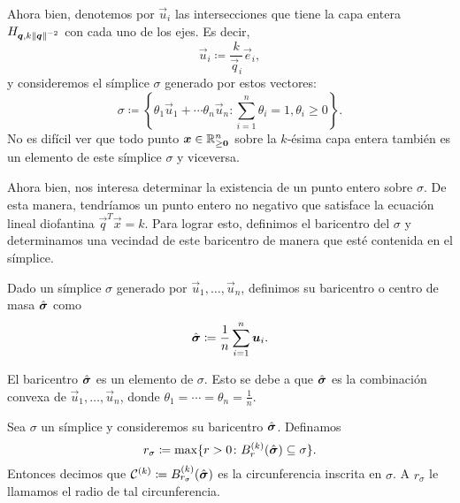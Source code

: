 Ahora bien, denotemos por $\vec{u}_i$ las intersecciones que tiene la capa entera $H_{\boldsymbol{q},
k\left\lVert \boldsymbol{q} \right\rVert^{-2}}$ con cada uno de los ejes. Es decir,
\begin{equation}
	\label{eq:generators}
	\vec{u}_i \coloneq \frac{k}{\vec{q}_i}\vec{e}_i,
\end{equation}
y consideremos el símplice $\sigma$ generado por estos vectores:
\begin{equation*}
	\sigma \coloneq \left\lbrace \theta_1\vec{u}_1 + \cdots \theta_n\vec{u}_n \colon
		\sum_{i=1}^{n}\theta_i = 1, \theta_i \geq 0 \right\rbrace.
\end{equation*}
No es difícil ver que todo punto $\boldsymbol{x} \in \mathbb{R}^n_{\geq \boldsymbol{0}}$ sobre la $k$-ésima capa entera
también es un elemento de este símplice $\sigma$ y viceversa.

Ahora bien, nos interesa determinar la existencia de un punto entero sobre $\sigma$. De esta manera,
tendríamos un punto entero no negativo que satisface la ecuación lineal diofantina
$\vec{q}^T\vec{x} = k$. Para lograr esto, definimos el baricentro del $\sigma$ y determinamos una
vecindad de este baricentro de manera que esté contenida en el símplice.

\begin{definition}
	Dado un símplice $\sigma$ generado por $\vec{u}_1, \ldots, \vec{u}_n$, definimos su baricentro o
	centro de masa $\hat{\boldsymbol{ \sigma }}$ como
	\begin{equation*}
		\hat{\boldsymbol{ \sigma }} \coloneq \frac{1}{n} \sum_{i=1}^{n}\boldsymbol{u}_i.
	\end{equation*}
\end{definition}
\begin{observation}
	El baricentro $\hat{\boldsymbol{ \sigma }}$ es un elemento de $\sigma$. Esto se debe a que $\hat{\boldsymbol{ \sigma }}$ es la
	combinación convexa de $\vec{u}_1, \ldots, \vec{u}_n$, donde $\theta_1 = \cdots = \theta_n =
	\frac{1}{n}$.
\end{observation}

\begin{definition}
	Sea $\sigma$ un símplice y consideremos su baricentro $\hat{\boldsymbol{ \sigma }}$. Definamos
	\begin{equation}
		\label{eq:def:r-sigma}
		r_\sigma \coloneq \max \lbrace r > 0 \colon B_r^{(k)}(\hat{\boldsymbol{ \sigma }})
		\subseteq \sigma \rbrace.
	\end{equation}
	Entonces decimos que $\mathcal{C}^{(k)} \coloneq
	B_{r_\sigma}^{(k)}(\hat{\boldsymbol{ \sigma }})$ es la circunferencia inscrita en $\sigma$. A
	$r_\sigma$ le llamamos el radio de tal circunferencia.
\end{definition}

